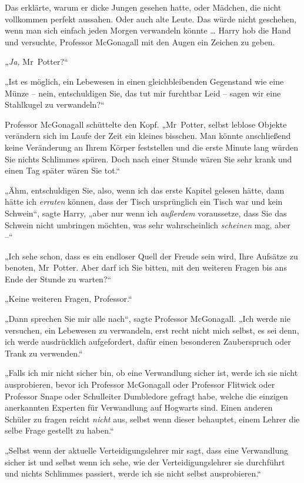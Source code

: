 {Das erklärte, warum er dicke Jungen gesehen hatte, oder Mädchen, die nicht vollkommen perfekt aussahen. Oder auch alte Leute. Das würde nicht geschehen, wenn man sich einfach jeden Morgen verwandeln könnte … Harry hob die Hand und versuchte, Professor McGonagall mit den Augen ein Zeichen zu geben.

\emph{„Ja,} Mr~Potter?“

„Ist es möglich, ein Lebewesen in einen gleichbleibenden Gegenstand wie eine Münze -- nein, entschuldigen Sie, das tut mir furchtbar Leid -- sagen wir eine Stahlkugel zu verwandeln?“

Professor McGonagall schüttelte den Kopf. „Mr~Potter, selbst leblose Objekte verändern sich im Laufe der Zeit ein kleines bisschen. Man könnte anschließend keine Veränderung an Ihrem Körper feststellen und die erste Minute lang würden Sie nichts Schlimmes spüren. Doch nach einer Stunde wären Sie sehr krank und einen Tag später wären Sie tot.“

„Ähm, entschuldigen Sie, also, wenn ich das erste Kapitel gelesen hätte, dann hätte ich \emph{erraten} können, dass der Tisch ursprünglich ein Tisch war und kein Schwein“, sagte Harry, „aber nur wenn ich \emph{außerdem} voraussetze, dass Sie das Schwein nicht umbringen möchten, was sehr wahrscheinlich \emph{scheinen} mag, aber --“

„Ich sehe schon, dass es ein endloser Quell der Freude sein wird, Ihre Aufsätze zu benoten, Mr~Potter. Aber darf ich Sie bitten, mit den weiteren Fragen bis ans Ende der Stunde zu warten?“

„Keine weiteren Fragen, Professor.“

„Dann sprechen Sie mir alle nach“, sagte Professor McGonagall. „Ich werde nie versuchen, ein Lebewesen zu verwandeln, erst recht nicht mich selbst, es sei denn, ich werde ausdrücklich aufgefordert, dafür einen besonderen Zauberspruch oder Trank zu verwenden.“

„Falls ich mir nicht sicher bin, ob eine Verwandlung sicher ist, werde ich sie nicht ausprobieren, bevor ich Professor McGonagall oder Professor Flitwick oder Professor Snape oder Schulleiter Dumbledore gefragt habe, welche die einzigen anerkannten Experten für Verwandlung auf Hogwarts sind. Einen anderen Schüler zu fragen reicht \emph{nicht} aus, selbst wenn dieser behauptet, einem Lehrer die selbe Frage gestellt zu haben.“

„Selbst wenn der aktuelle Verteidigungslehrer mir sagt, dass eine Verwandlung sicher ist und selbst wenn ich sehe, wie der Verteidigungslehrer sie durchführt und nichts Schlimmes passiert, werde ich sie nicht selbst ausprobieren.“

}

